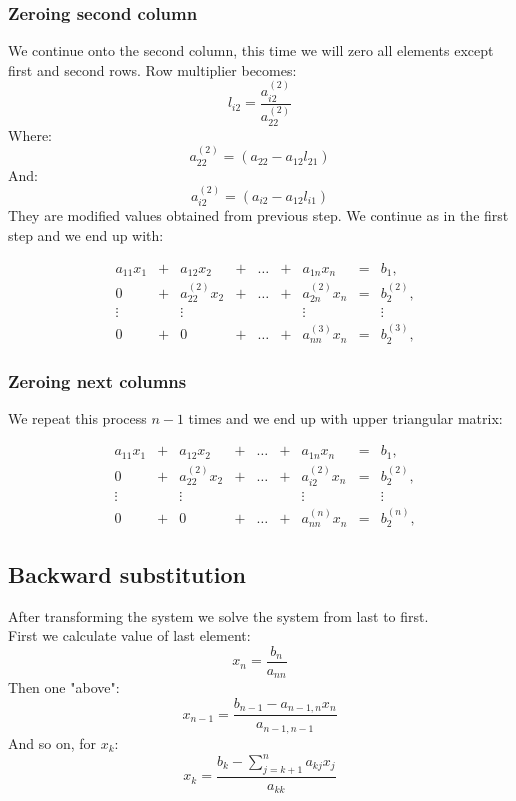 \subsubsection{Zeroing second column}
We continue onto the second column, this time we will zero all elements except first and second rows.
Row multiplier becomes:
\[ l_{i2} = \frac{ a_{i2}^{(2)} }{ a_{22}^{(2)} } \]
Where:
\[ a_{22}^{(2)} = (a_{22} - a_{12}l_{21}) \]
And:
\[ a_{i2}^{(2)} = (a_{i2} - a_{12}l_{i1}) \]
\newpage
They are modified values obtained from previous step.
We continue as in the first step and we end up with:

\[
\begin{matrix}

&a_{11}x_1 &{}+&a_{12}x_2&+&\dots&+&a_{1n}x_n &=&b_1,\\

&0 &{}+& a_{22}^{(2)}x_2&{}+&\dots&{}+& a_{2n}^{(2)}x_n &=&b_2^{(2)},\\

&\vdots    &&\vdots      & &     & &  \vdots  & &\vdots\\

&0 &{}+& 0 &{}+&\dots&{}+& a_{nn}^{(3)}x_n &=&b_2^{(3)},

\end{matrix}
\]

\subsubsection{Zeroing next columns}
We repeat this process $n-1$ times and we end up with upper triangular matrix:

\[
\begin{matrix}

&a_{11}x_1 &{}+&a_{12}x_2&+&\dots&+&a_{1n}x_n &=&b_1,\\

&0 &{}+& a_{22}^{(2)}x_2&{}+&\dots&{}+& a_{i2}^{(2)}x_n &=&b_2^{(2)},\\

&\vdots    &&\vdots      & &     & &  \vdots  & &\vdots\\

&0 &{}+& 0 &{}+&\dots&{}+& a_{nn}^{(n)}x_n &=&b_2^{(n)},

\end{matrix}
\]

\subsection{Backward substitution}
After transforming the system we solve the system from last to first. \\
First we calculate value of last element:
\[ x_n = \frac{b_n}{a_{nn}} \]
Then one "above":
\[ x_{n-1} = \frac{ b_{n-1} - a_{n-1, n}x_n}{a_{n-1, n-1}} \]
And so on, for $x_k$:
\[ x_{k} = \frac{b_k - \sum_{j = k + 1}^n a_{kj}x_j}{a_{kk}} \]

